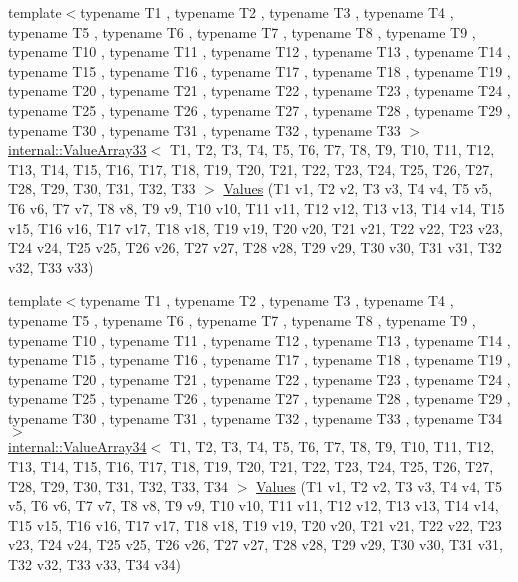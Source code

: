 \begin{DoxyCompactItemize}
{\footnotesize template$<$typename T1 , typename T2 , typename T3 , typename T4 , typename T5 , typename T6 , typename T7 , typename T8 , typename T9 , typename T10 , typename T11 , typename T12 , typename T13 , typename T14 , typename T15 , typename T16 , typename T17 , typename T18 , typename T19 , typename T20 , typename T21 , typename T22 , typename T23 , typename T24 , typename T25 , typename T26 , typename T27 , typename T28 , typename T29 , typename T30 , typename T31 , typename T32 , typename T33 $>$ }\\\mbox{\hyperlink{classtesting_1_1internal_1_1ValueArray33}{internal\+::\+Value\+Array33}}$<$ T1, T2, T3, T4, T5, T6, T7, T8, T9, T10, T11, T12, T13, T14, T15, T16, T17, T18, T19, T20, T21, T22, T23, T24, T25, T26, T27, T28, T29, T30, T31, T32, T33 $>$ \mbox{\hyperlink{namespacetesting_ac972228f2ff86974ab6591a10512326a}{Values}} (T1 v1, T2 v2, T3 v3, T4 v4, T5 v5, T6 v6, T7 v7, T8 v8, T9 v9, T10 v10, T11 v11, T12 v12, T13 v13, T14 v14, T15 v15, T16 v16, T17 v17, T18 v18, T19 v19, T20 v20, T21 v21, T22 v22, T23 v23, T24 v24, T25 v25, T26 v26, T27 v27, T28 v28, T29 v29, T30 v30, T31 v31, T32 v32, T33 v33)
\item 
{\footnotesize template$<$typename T1 , typename T2 , typename T3 , typename T4 , typename T5 , typename T6 , typename T7 , typename T8 , typename T9 , typename T10 , typename T11 , typename T12 , typename T13 , typename T14 , typename T15 , typename T16 , typename T17 , typename T18 , typename T19 , typename T20 , typename T21 , typename T22 , typename T23 , typename T24 , typename T25 , typename T26 , typename T27 , typename T28 , typename T29 , typename T30 , typename T31 , typename T32 , typename T33 , typename T34 $>$ }\\\mbox{\hyperlink{classtesting_1_1internal_1_1ValueArray34}{internal\+::\+Value\+Array34}}$<$ T1, T2, T3, T4, T5, T6, T7, T8, T9, T10, T11, T12, T13, T14, T15, T16, T17, T18, T19, T20, T21, T22, T23, T24, T25, T26, T27, T28, T29, T30, T31, T32, T33, T34 $>$ \mbox{\hyperlink{namespacetesting_a37ae9a0b15ed1e02fda22769ef76c97e}{Values}} (T1 v1, T2 v2, T3 v3, T4 v4, T5 v5, T6 v6, T7 v7, T8 v8, T9 v9, T10 v10, T11 v11, T12 v12, T13 v13, T14 v14, T15 v15, T16 v16, T17 v17, T18 v18, T19 v19, T20 v20, T21 v21, T22 v22, T23 v23, T24 v24, T25 v25, T26 v26, T27 v27, T28 v28, T29 v29, T30 v30, T31 v31, T32 v32, T33 v33, T34 v34)
\item 

\end{DoxyCompactItemize}
